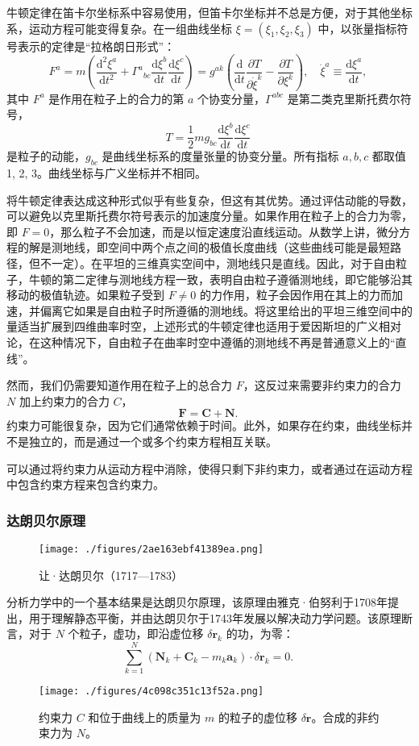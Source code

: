 牛顿定律在笛卡尔坐标系中容易使用，但笛卡尔坐标并不总是方便，对于其他坐标系，运动方程可能变得复杂。在一组曲线坐标 \(\xi = (\xi_1, \xi_2, \xi_3)\) 中，以张量指标符号表示的定律是“拉格朗日形式”：
\[
F^{a} = m\left(\frac{\mathrm{d}^{2}\xi^{a}}{\mathrm{d}t^{2}} + \Gamma^{a}{}_{bc} \frac{\mathrm{d}\xi^{b}}{\mathrm{d}t} \frac{\mathrm{d}\xi^{c}}{\mathrm{d}t}\right) = g^{ak}\left(\frac{\mathrm{d}}{\mathrm{d}t} \frac{\partial T}{\partial \dot{\xi}^{k}} - \frac{\partial T}{\partial \xi^{k}}\right), \quad \dot{\xi}^{a} \equiv \frac{\mathrm{d}\xi^{a}}{\mathrm{d}t},~
\]
其中 \(F^{a}\) 是作用在粒子上的合力的第 \(a\) 个协变分量，\(\Gamma^{abc}\) 是第二类克里斯托费尔符号，
\[
T = \frac{1}{2}mg_{bc} \frac{\mathrm{d}\xi^{b}}{\mathrm{d}t} \frac{\mathrm{d}\xi^{c}}{\mathrm{d}t}~
\]
是粒子的动能，\(g_{bc}\) 是曲线坐标系的度量张量的协变分量。所有指标 \(a, b, c\) 都取值 1, 2, 3。曲线坐标与广义坐标并不相同。

将牛顿定律表达成这种形式似乎有些复杂，但这有其优势。通过评估动能的导数，可以避免以克里斯托费尔符号表示的加速度分量。如果作用在粒子上的合力为零，即 \(F = 0\)，那么粒子不会加速，而是以恒定速度沿直线运动。从数学上讲，微分方程的解是测地线，即空间中两个点之间的极值长度曲线（这些曲线可能是最短路径，但不一定）。在平坦的三维真实空间中，测地线只是直线。因此，对于自由粒子，牛顿的第二定律与测地线方程一致，表明自由粒子遵循测地线，即它能够沿其移动的极值轨迹。如果粒子受到 \(F \neq 0\) 的力作用，粒子会因作用在其上的力而加速，并偏离它如果是自由粒子时所遵循的测地线。将这里给出的平坦三维空间中的量适当扩展到四维曲率时空，上述形式的牛顿定律也适用于爱因斯坦的广义相对论，在这种情况下，自由粒子在曲率时空中遵循的测地线不再是普通意义上的“直线”。

然而，我们仍需要知道作用在粒子上的总合力 \(F\)，这反过来需要非约束力的合力 \(N\) 加上约束力的合力 \(C\)，
\[
\mathbf{F} = \mathbf{C} + \mathbf{N}.~
\]
约束力可能很复杂，因为它们通常依赖于时间。此外，如果存在约束，曲线坐标并不是独立的，而是通过一个或多个约束方程相互关联。

可以通过将约束力从运动方程中消除，使得只剩下非约束力，或者通过在运动方程中包含约束方程来包含约束力。
\subsubsection{达朗贝尔原理}
\begin{figure}[ht]
\centering
\texttt{[image: ./figures/2ae163ebf41389ea.png]}
\caption{让·达朗贝尔（1717—1783）} \label{fig_LGL_5}
\end{figure}
分析力学中的一个基本结果是达朗贝尔原理，该原理由雅克·伯努利于1708年提出，用于理解静态平衡，并由达朗贝尔于1743年发展以解决动力学问题。该原理断言，对于 \(N\) 个粒子，虚功，即沿虚位移 \(\delta \mathbf{r}_k\) 的功，为零：
\[
\sum_{k=1}^{N}(\mathbf{N}_{k}+\mathbf{C}_{k}-m_{k}\mathbf{a}_{k}) \cdot \delta \mathbf{r}_{k} = 0.~
\]
\begin{figure}[ht]
\centering
\texttt{[image: ./figures/4c098c351c13f52a.png]}
\caption{约束力 \(C\) 和位于曲线上的质量为 \(m\) 的粒子的虚位移 \(\delta \mathbf{r}\)。合成的非约束力为 \(N\)。} \label{fig_LGL_6}
\end{figure}